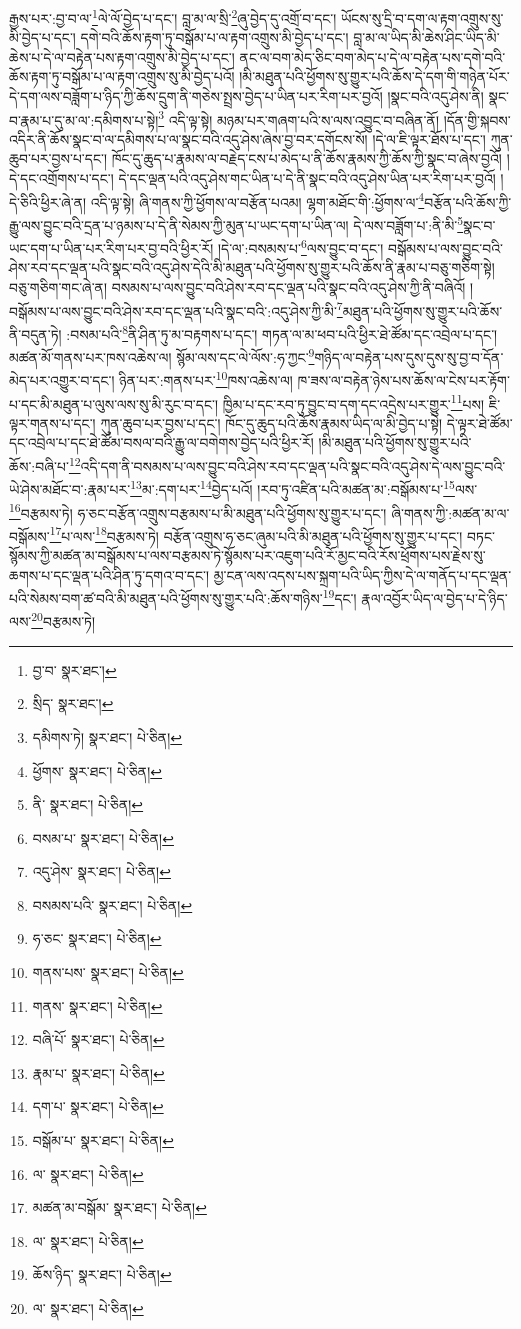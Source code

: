 རྒྱས་པར་:བྱ་བ་ལ་\footnote{བྱ་བ་  སྣར་ཐང་། }ལེ་ལོ་བྱེད་པ་དང་། བླ་མ་ལ་སྲི་\footnote{སྲིད་  སྣར་ཐང་། }ཞུ་བྱེད་དུ་འགྲོ་བ་དང་། ཡོངས་སུ་དྲི་བ་དག་ལ་རྟག་འགྲུས་སུ་མི་བྱེད་པ་དང་། དགེ་བའི་ཆོས་རྟག་ཏུ་བསྒོམ་པ་ལ་རྟག་འགྲུས་མི་བྱེད་པ་དང་། བླ་མ་ལ་ཡིད་མི་ཆེས་ཤིང་ཡིད་མི་ཆེས་པ་དེ་ལ་བརྟེན་པས་རྟག་འགྲུས་མི་བྱེད་པ་དང་། ནང་ལ་བག་མེད་ཅིང་བག་མེད་པ་དེ་ལ་བརྟེན་པས་དགེ་བའི་ཆོས་རྟག་ཏུ་བསྒོམ་པ་ལ་རྟག་འགྲུས་སུ་མི་བྱེད་པའོ། །མི་མཐུན་པའི་ཕྱོགས་སུ་གྱུར་པའི་ཆོས་དེ་དག་གི་གཉེན་པོར་དེ་དག་ལས་བཟློག་པ་ཉིད་ཀྱི་ཆོས་དྲུག་ནི་གཅེས་སྤྲས་བྱེད་པ་ཡིན་པར་རིག་པར་བྱའོ། །སྣང་བའི་འདུ་ཤེས་ནི། སྣང་བ་རྣམ་པ་དུ་མ་ལ་:དམིགས་པ་སྟེ།\footnote{དམིགས་ཏེ།  སྣར་ཐང་།  པེ་ཅིན། } འདི་ལྟ་སྟེ། མཉམ་པར་གཞག་པའི་ས་ལས་འབྱུང་བ་བཞིན་ནོ། །དོན་གྱི་སྐབས་འདིར་ནི་ཆོས་སྣང་བ་ལ་དམིགས་པ་ལ་སྣང་བའི་འདུ་ཤེས་ཞེས་བྱ་བར་དགོངས་སོ། །དེ་ལ་ཇི་ལྟར་ཐོས་པ་དང་། ཀུན་ཆུབ་པར་བྱས་པ་དང་། ཁོང་དུ་ཆུད་པ་རྣམས་ལ་བརྗེད་ངས་པ་མེད་པ་ནི་ཆོས་རྣམས་ཀྱི་ཆོས་ཀྱི་སྣང་བ་ཞེས་བྱའོ། །དེ་དང་འགྲོགས་པ་དང་། དེ་དང་ལྡན་པའི་འདུ་ཤེས་གང་ཡིན་པ་དེ་ནི་སྣང་བའི་འདུ་ཤེས་ཡིན་པར་རིག་པར་བྱའོ། །དེ་ཅིའི་ཕྱིར་ཞེ་ན། འདི་ལྟ་སྟེ། ཞི་གནས་ཀྱི་ཕྱོགས་ལ་བརྩོན་པའམ། ལྷག་མཐོང་གི་:ཕྱོགས་ལ་\footnote{ཕྱོགས་  སྣར་ཐང་།  པེ་ཅིན། }བརྩོན་པའི་ཆོས་ཀྱི་རྒྱུ་ལས་བྱུང་བའི་དྲན་པ་ཉམས་པ་དེ་ནི་སེམས་ཀྱི་མུན་པ་ཡང་དག་པ་ཡིན་ལ། དེ་ལས་བཟློག་པ་:ནི་མི་\footnote{ནི་  སྣར་ཐང་།  པེ་ཅིན། }སྣང་བ་ཡང་དག་པ་ཡིན་པར་རིག་པར་བྱ་བའི་ཕྱིར་རོ། །དེ་ལ་:བསམས་པ་\footnote{བསམ་པ་  སྣར་ཐང་།  པེ་ཅིན། }ལས་བྱུང་བ་དང་། བསྒོམས་པ་ལས་བྱུང་བའི་ཤེས་རབ་དང་ལྡན་པའི་སྣང་བའི་འདུ་ཤེས་དེའི་མི་མཐུན་པའི་ཕྱོགས་སུ་གྱུར་པའི་ཆོས་ནི་རྣམ་པ་བཅུ་གཅིག་སྟེ། བཅུ་གཅིག་གང་ཞེ་ན། བསམས་པ་ལས་བྱུང་བའི་ཤེས་རབ་དང་ལྡན་པའི་སྣང་བའི་འདུ་ཤེས་ཀྱི་ནི་བཞིའོ། །བསྒོམས་པ་ལས་བྱུང་བའི་ཤེས་རབ་དང་ལྡན་པའི་སྣང་བའི་:འདུ་ཤེས་ཀྱི་མི་\footnote{འདུ་ཤེས་  སྣར་ཐང་།  པེ་ཅིན། }མཐུན་པའི་ཕྱོགས་སུ་གྱུར་པའི་ཆོས་ནི་བདུན་ཏེ། :བསམ་པའི་\footnote{བསམས་པའི་  སྣར་ཐང་།  པེ་ཅིན། }ནི་ཤིན་ཏུ་མ་བརྟགས་པ་དང་། གཏན་ལ་མ་ཕབ་པའི་ཕྱིར་ཐེ་ཚོམ་དང་འབྲེལ་པ་དང་། མཚན་མོ་གནས་པར་ཁས་འཆེས་ལ། སྙོམ་ལས་དང་ལེ་ལོས་:ཧ་ཀྱང་\footnote{ཧ་ཅང་  སྣར་ཐང་།  པེ་ཅིན། }གཉིད་ལ་བརྟེན་པས་དུས་དུས་སུ་བྱ་བ་དོན་མེད་པར་འགྱུར་བ་དང་། ཉིན་པར་:གནས་པར་\footnote{གནས་པས་  སྣར་ཐང་།  པེ་ཅིན། }ཁས་འཆེས་ལ། ཁ་ཟས་ལ་བརྟེན་ཉེས་པས་ཆོས་ལ་ངེས་པར་རྟོག་པ་དང་མི་མཐུན་པ་ལུས་ལས་སུ་མི་རུང་བ་དང་། ཁྱིམ་པ་དང་རབ་ཏུ་བྱུང་བ་དག་དང་འདྲེས་པར་གྱུར་\footnote{གནས་  སྣར་ཐང་།  པེ་ཅིན། }པས། ཇི་ལྟར་གནས་པ་དང་། ཀུན་ཆུབ་པར་བྱས་པ་དང་། ཁོང་དུ་ཆུད་པའི་ཆོས་རྣམས་ཡིད་ལ་མི་བྱེད་པ་སྟེ། དེ་ལྟར་ཐེ་ཚོམ་དང་འབྲེལ་པ་དང་ཐེ་ཚོམ་བསལ་བའི་རྒྱུ་ལ་བགེགས་བྱེད་པའི་ཕྱིར་རོ། །མི་མཐུན་པའི་ཕྱོགས་སུ་གྱུར་པའི་ཆོས་:བཞི་པ་\footnote{བཞི་པོ་  སྣར་ཐང་།  པེ་ཅིན། }འདི་དག་ནི་བསམས་པ་ལས་བྱུང་བའི་ཤེས་རབ་དང་ལྡན་པའི་སྣང་བའི་འདུ་ཤེས་དེ་ལས་བྱུང་བའི་ཡེ་ཤེས་མཐོང་བ་:རྣམ་པར་\footnote{རྣམ་པ་  སྣར་ཐང་།  པེ་ཅིན། }མ་:དག་པར་\footnote{དག་པ་  སྣར་ཐང་།  པེ་ཅིན། }བྱེད་པའོ། །རབ་ཏུ་འཛིན་པའི་མཚན་མ་:བསྒོམས་པ་\footnote{བསྒོམ་པ་  སྣར་ཐང་།  པེ་ཅིན། }ལས་\footnote{ལ་  སྣར་ཐང་།  པེ་ཅིན། }བརྩམས་ཏེ། ཧ་ཅང་བརྩོན་འགྲུས་བརྩམས་པ་མི་མཐུན་པའི་ཕྱོགས་སུ་གྱུར་པ་དང་། ཞི་གནས་ཀྱི་:མཚན་མ་ལ་བསྒོམས་\footnote{མཚན་མ་བསྒོམ་  སྣར་ཐང་།  པེ་ཅིན། }པ་ལས་\footnote{ལ་  སྣར་ཐང་།  པེ་ཅིན། }བརྩམས་ཏེ། བརྩོན་འགྲུས་ཧ་ཅང་ཞུམ་པའི་མི་མཐུན་པའི་ཕྱོགས་སུ་གྱུར་པ་དང་། བཏང་སྙོམས་ཀྱི་མཚན་མ་བསྒོམས་པ་ལས་བརྩམས་ཏེ་སྙོམས་པར་འཇུག་པའི་རོ་མྱང་བའི་རོས་ཕྲོགས་པས་རྗེས་སུ་ཆགས་པ་དང་ལྡན་པའི་ཤིན་ཏུ་དགའ་བ་དང་། མྱ་ངན་ལས་འདས་པས་སྐྲག་པའི་ཡིད་ཀྱིས་དེ་ལ་གནོད་པ་དང་ལྡན་པའི་སེམས་བག་ཚ་བའི་མི་མཐུན་པའི་ཕྱོགས་སུ་གྱུར་པའི་:ཆོས་གཉིས་\footnote{ཆོས་ཉིད་  སྣར་ཐང་།  པེ་ཅིན། }དང་། རྣལ་འབྱོར་ཡིད་ལ་བྱེད་པ་དེ་ཉིད་ལས་\footnote{ལ་  སྣར་ཐང་།  པེ་ཅིན། }བརྩམས་ཏེ། 